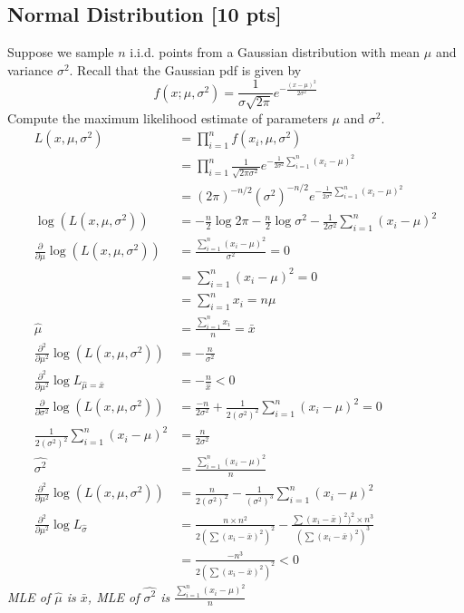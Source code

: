 \documentclass{article}
\begin{document}
\subsection{Normal Distribution [10 pts]}
Suppose we sample $n$ i.i.d. points from a Gaussian distribution with mean $\mu$ and variance $\sigma^2$. Recall that the Gaussian pdf is given by
\[
f(x;\mu,\sigma^2) = \frac{1}{\sigma\sqrt{2\pi}}e^{-\frac{(x-\mu)^2}{2\sigma^2}}
\]
Compute the maximum likelihood estimate of parameters $\mu$ and $\sigma^2$. \newline\begin{align*}
    L(x,\mu,\sigma^2)&=\prod_{i=1}^n f(x_i,\mu,\sigma^2) \\
    &=\prod_{i=1}^n\frac{1}{\sqrt{2\pi\sigma^2}}e^{-\frac{1}{2\sigma^2}\sum_{i=1}^n(x_i-\mu)^2} \\
    &=(2\pi)^{-n/2}(\sigma^2)^{-n/2}e^{-\frac{1}{2\sigma^2}\sum_{i=1}^n(x_i-\mu)^2} \\
    \log(L(x,\mu,\sigma^2))&=-\frac{n}{2}\log2\pi-\frac{n}{2}\log\sigma^2-\frac{1}{2\sigma^2}\sum_{i=1}^n(x_i-\mu)^2 \\
    \frac{\partial}{\partial\mu}\log(L(x,\mu,\sigma^2))&=\frac{\sum_{i=1}^n(x_i-\mu)^2}{\sigma^2}=0 \\
    &=\sum_{i=1}^n(x_i-\mu)^2=0 \\
    &=\sum_{i=1}^n x_i = n\mu \\
    \hat{\mu}&=\frac{\sum_{i=1}^n x_i}{n}=\bar{x} \\
    \frac{\partial^2}{\partial\mu^2}\log(L(x,\mu,\sigma^2))&=-\frac{n}{\sigma^2} \\
    \frac{\partial^2}{\partial\mu^2}\log L_{\hat{\mu}=\bar{x}}&=-\frac{n}{\hat{x}}<0 \\
    \frac{\partial}{\partial\sigma^2}\log(L(x,\mu,\sigma^2))&=\frac{-n}{2\sigma^2} + \frac{1}{2(\sigma^2)^2}\sum_{i=1}^n(x_i-\mu)^2 = 0 \\
    \frac{1}{2(\sigma^2)^2}\sum_{i=1}^n(x_i-\mu)^2 &= \frac{n}{2\sigma^2} \\
    \hat{\sigma^2}&=\frac{\sum_{i=1}^n(x_i-\mu)^2}{n} \\
    \frac{\partial^2}{\partial\mu^2}\log(L(x,\mu,\sigma^2))&=\frac{n}{2(\sigma^2)^2}-\frac{1}{(\sigma^2)^3}\sum_{i=1}^n(x_i-\mu)^2 \\
    \frac{\partial^2}{\partial\mu^2}\log L_{\hat{\sigma}}&=\frac{n\times n^2}{2(\sum(x_i-\bar{x})^2)^2}-\frac{\sum(x_i-\bar{x})^2)^2\times n^3}{(\sum(x_i-\bar{x})^2)^3} \\
    &=\frac{-n^3}{2(\sum(x_i-\bar{x})^2)^2} < 0
\end{align*}
\emph{MLE of $\hat{\mu}$ is $\bar{x}$, MLE of $\hat{\sigma^2}$ is $\frac{\sum_{i=1}^n(x_i-\mu)^2}{n}$}
\end{document}
